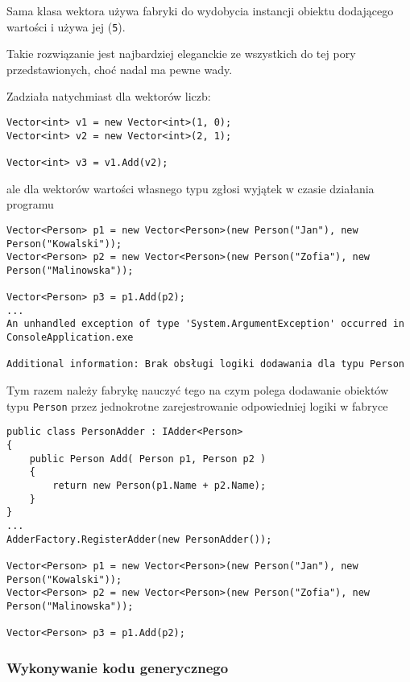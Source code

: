 Sama klasa wektora używa fabryki do wydobycia instancji obiektu dodającego wartości i używa jej ({\tt 5}).

Takie rozwiązanie jest najbardziej eleganckie ze wszystkich do tej pory przedstawionych, choć nadal ma pewne wady.

Zadziała natychmiast dla wektorów liczb:

\begin{scriptsize}
\begin{verbatim}
Vector<int> v1 = new Vector<int>(1, 0);
Vector<int> v2 = new Vector<int>(2, 1);

Vector<int> v3 = v1.Add(v2);
\end{verbatim}
\end{scriptsize}

ale dla wektorów wartości własnego typu zgłosi wyjątek w czasie działania programu

\begin{scriptsize}
\begin{verbatim}
Vector<Person> p1 = new Vector<Person>(new Person("Jan"), new Person("Kowalski"));
Vector<Person> p2 = new Vector<Person>(new Person("Zofia"), new Person("Malinowska"));

Vector<Person> p3 = p1.Add(p2);
...
An unhandled exception of type 'System.ArgumentException' occurred in ConsoleApplication.exe

Additional information: Brak obsługi logiki dodawania dla typu Person
\end{verbatim}
\end{scriptsize}

Tym razem należy fabrykę nauczyć tego na czym polega dodawanie obiektów typu {\tt Person} przez 
jednokrotne zarejestrowanie odpowiedniej logiki w fabryce

\begin{scriptsize}
\begin{verbatim}
public class PersonAdder : IAdder<Person>
{
    public Person Add( Person p1, Person p2 )
    {
        return new Person(p1.Name + p2.Name);
    }
}
...
AdderFactory.RegisterAdder(new PersonAdder());

Vector<Person> p1 = new Vector<Person>(new Person("Jan"), new Person("Kowalski"));
Vector<Person> p2 = new Vector<Person>(new Person("Zofia"), new Person("Malinowska"));

Vector<Person> p3 = p1.Add(p2);
\end{verbatim}
\end{scriptsize}

\subsubsection{Wykonywanie kodu generycznego}

